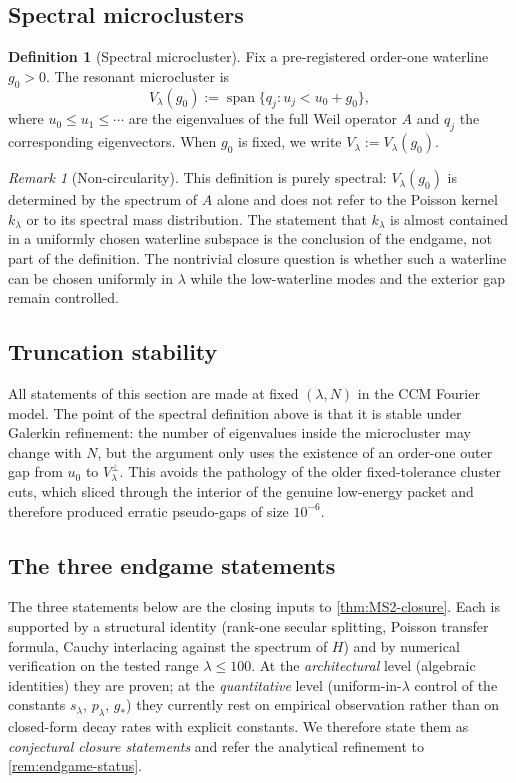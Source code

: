 \documentclass[12pt,a4paper]{article}
\theoremstyle{definition}
\newtheorem{definition}[theorem]{Definition}
\theoremstyle{remark}
\newtheorem{remark}[theorem]{Remark}
\begin{document}
\subsection{Spectral microclusters}

\begin{definition}[Spectral microcluster]
\label{def:geff}
Fix a pre-registered order-one waterline $g_0 > 0$.  The resonant
microcluster is
\[
  V_\lambda(g_0) := \operatorname{span}\{q_j : u_j < u_0 + g_0\},
\]
where $u_0 \le u_1 \le \cdots$ are the eigenvalues of the full Weil
operator $A$ and $q_j$ the corresponding eigenvectors.  When $g_0$ is
fixed, we write $V_\lambda:=V_\lambda(g_0)$.
\end{definition}

\begin{remark}[Non-circularity]
This definition is purely spectral: $V_\lambda(g_0)$ is determined by the
spectrum of $A$ alone and does not refer to the Poisson kernel $k_\lambda$
or to its spectral mass distribution.  The statement that
$k_\lambda$ is almost contained in a uniformly chosen waterline subspace is
the conclusion of the endgame, not part of the definition.  The
nontrivial closure question is whether such a waterline can be chosen
uniformly in $\lambda$ while the low-waterline modes and the exterior gap
remain controlled.
\end{remark}

\subsection{Truncation stability}

All statements of this section are made at fixed $(\lambda,N)$ in the
CCM Fourier model.  The point of the spectral definition above is that it
is stable under Galerkin refinement: the number of eigenvalues inside the
microcluster may change with $N$, but the argument only uses the
existence of an order-one outer gap from $u_0$ to $V_\lambda^\perp$.
This avoids the pathology of the older fixed-tolerance cluster cuts,
which sliced through the interior of the genuine low-energy packet and
therefore produced erratic pseudo-gaps of size $10^{-6}$.

\subsection{The three endgame statements}

The three statements below are the closing inputs to
\cref{thm:MS2-closure}.  Each is supported by a structural identity
(rank-one secular splitting, Poisson transfer formula, Cauchy
interlacing against the spectrum of $H$) and by numerical
verification on the tested range $\lambda \le 100$.  At the
\emph{architectural} level (algebraic identities) they are proven; at
the \emph{quantitative} level (uniform-in-$\lambda$ control of the
constants $s_\lambda$, $p_\lambda$, $g_*$) they currently rest on
empirical observation rather than on closed-form decay rates with
explicit constants.  We therefore state them as \emph{conjectural
closure statements} and refer the analytical refinement to
\cref{rem:endgame-status}.
\end{document}
